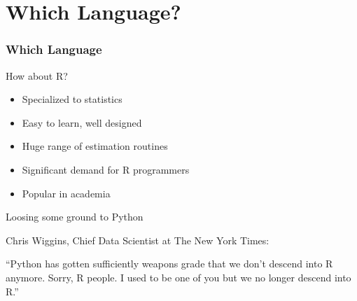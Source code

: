 \section{Which Language?}


\begin{frame}
    \frametitle{Which Language}


    How about R?
    \vspace{0.5em}

    \begin{itemize}
        \item Specialized to statistics
            \vspace{0.5em}
        \item Easy to learn, well designed
            \vspace{0.5em}
        \item Huge range of estimation routines
            \vspace{0.5em}
        \item Significant demand for R programmers
            \vspace{0.5em}
        \item Popular in academia 
    \end{itemize}

\end{frame}


\begin{frame}
    
    Loosing some ground to Python
            \vspace{0.5em}
            \vspace{0.5em}
            \vspace{0.5em}

    \Eg Chris Wiggins, Chief Data Scientist at The New York Times:

            \vspace{0.5em}
     ``Python has gotten sufficiently weapons grade that we don't descend into
     R anymore. Sorry, R people. I used to be one of you but we no longer
     descend into R.''


\end{frame}


